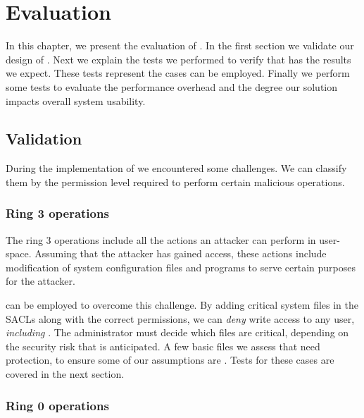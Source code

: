 \acresetall
\chapter{Evaluation}\label{ch:chapter4}

In this chapter, we present the evaluation of . In the first section we validate our design of . Next we explain the tests we performed to verify that  has the results we expect. These tests represent the cases  can be employed. Finally we perform some tests to evaluate the performance overhead and the degree our solution impacts overall system usability.

\section{Validation}\label{sec:validation}

\par During the implementation of  we encountered some challenges. We can classify them by the permission level required to perform certain malicious operations. 

\subsection{Ring 3 operations}

\par The ring 3 operations include all the actions an attacker can perform in user-space. Assuming that the attacker has gained  access, these actions include modification of system configuration files and programs to serve certain purposes for the attacker. 
\par {} can be employed to overcome this challenge. By adding critical system files in the \acp{SACL} along with the correct permissions, we can \emph{deny} write access to any user, \emph{including} . The administrator must decide which files are critical, depending on the security risk that is anticipated. A few basic files we assess that need protection, to ensure some of our assumptions are . Tests for these cases are covered in the next section.

\subsection{Ring 0 operations}

